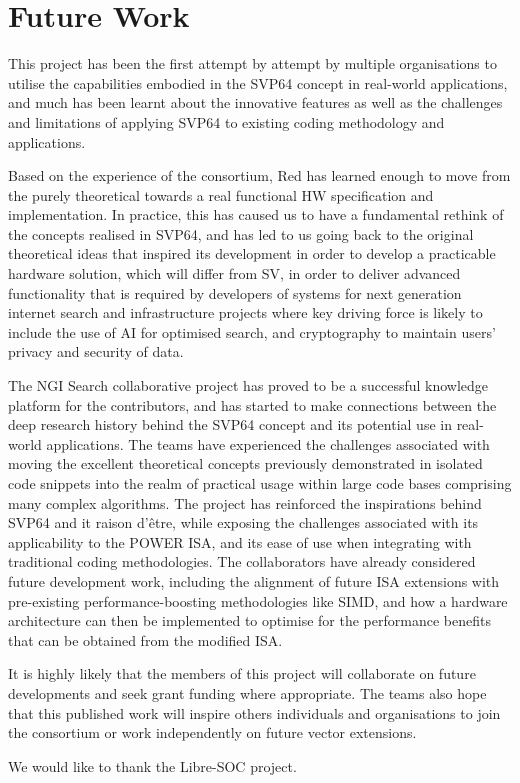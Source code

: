 \section{Future Work}

This project has been the first attempt by attempt by multiple organisations
to utilise the capabilities embodied in the SVP64 concept in real-world
applications, and much has been learnt about the innovative features as well
as the challenges and limitations of applying SVP64 to existing
coding methodology and applications.

Based on the experience of the consortium, Red has learned enough to move from
the purely theoretical towards a real functional HW specification
and implementation.
In practice, this has caused us to have a fundamental rethink of the concepts
realised in SVP64, and has led to us going back to the original theoretical
ideas that inspired its development in order to develop a practicable hardware
solution, which will differ from \acrshort{SV}, in order to deliver
advanced functionality that is required by developers of systems for next
generation internet search and infrastructure projects where key driving force
is likely to include the use of AI for optimised search, and cryptography to
maintain users' privacy and security of data.

The NGI Search collaborative project has proved to be a successful knowledge
platform for the contributors, and has started to make connections between the
deep research history behind the SVP64 concept and its potential use in
real-world applications. The teams have experienced the challenges associated
with moving the excellent theoretical concepts previously demonstrated in
isolated code snippets into the realm of practical usage within large code
bases comprising many complex algorithms. The project has reinforced the
inspirations behind SVP64 and it raison d’être, while exposing the challenges
associated with its applicability to the POWER ISA, and its ease of use when
integrating with traditional coding methodologies. The collaborators have
already considered future development work, including the alignment of future
ISA extensions with pre-existing performance-boosting methodologies like SIMD,
and how a hardware architecture can then be implemented to optimise for the
performance benefits that can be obtained from the modified ISA.

It is highly likely that the members of this project will collaborate on future
developments and seek grant funding where appropriate. The teams also hope that
this published work will inspire others individuals and organisations to join
the consortium or work independently on future vector extensions.

We would like to thank the Libre-SOC project.
